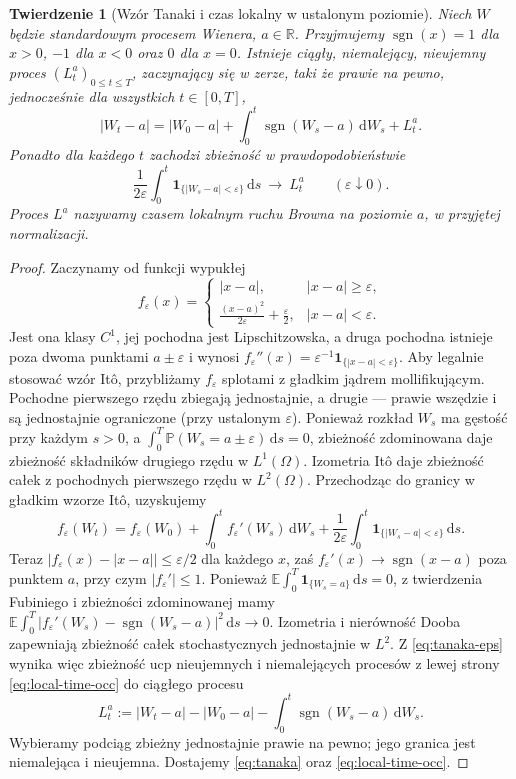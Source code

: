 \documentclass[11pt,a4paper,oneside]{report}
\numberwithin{equation}{chapter}
\theoremstyle{plain}
\newtheorem{twierdzenie}{Twierdzenie}[chapter]
\theoremstyle{definition}
\theoremstyle{remark}
\newcommand{\R}{\mathbb{R}}
\newcommand{\Prob}{\mathbb{P}}
\newcommand{\E}{\mathbb{E}}
\newcommand{\ind}[1]{\mathbf{1}_{#1}}
\newcommand{\dd}{\mathrm{d}}
\begin{document}
\begin{twierdzenie}[Wzór Tanaki i czas lokalny w ustalonym poziomie]\label{thm:volIII:03:05}
\label{th:tanaka}
Niech $W$ będzie standardowym procesem Wienera, $a\in\R$.
Przyjmujemy $\operatorname{sgn}(x)=1$ dla $x>0$,
$-1$ dla $x<0$ oraz $0$ dla $x=0$. Istnieje ciągły,
niemalejący, nieujemny proces $(L_t^a)_{0\le t\le T}$,
zaczynający się w zerze, taki że prawie na pewno,
jednocześnie dla wszystkich $t\in[0,T]$,
\[
|W_t-a|=|W_0-a|+\int_0^t\operatorname{sgn}(W_s-a)
\,\dd W_s+L_t^a.
\tag{3.7}\label{eq:tanaka}
\]
Ponadto dla każdego $t$ zachodzi zbieżność w
prawdopodobieństwie
\[
\frac1{2\varepsilon}\int_0^t
\ind{\{|W_s-a|<\varepsilon\}}\,\dd s
\ \longrightarrow\ L_t^a
\qquad(\varepsilon\downarrow0).
\tag{3.8}\label{eq:local-time-occ}
\]
Proces $L^a$ nazywamy \emph{czasem lokalnym} ruchu Browna
na poziomie $a$, w przyjętej normalizacji.
\end{twierdzenie}
\begin{proof}
Zaczynamy od funkcji wypukłej
\[
f_\varepsilon(x)=
\begin{cases}
|x-a|,&|x-a|\ge\varepsilon,\\
\displaystyle\frac{(x-a)^2}{2\varepsilon}+
\frac\varepsilon2,&|x-a|<\varepsilon.
\end{cases}
\]
Jest ona klasy $C^1$, jej pochodna jest Lipschitzowska,
a druga pochodna istnieje poza dwoma punktami
$a\pm\varepsilon$ i wynosi
$f_\varepsilon''(x)=\varepsilon^{-1}
\ind{\{|x-a|<\varepsilon\}}$.
Aby legalnie stosować wzór Itô, przybliżamy
$f_\varepsilon$ splotami z gładkim jądrem
mollifikującym. Pochodne pierwszego rzędu zbiegają
jednostajnie, a drugie — prawie wszędzie i są
jednostajnie ograniczone (przy ustalonym
$\varepsilon$). Ponieważ rozkład $W_s$ ma gęstość
przy każdym $s>0$, a $\int_0^T\Prob(W_s=a\pm\varepsilon)
\,\dd s=0$, zbieżność zdominowana daje
zbieżność składników drugiego rzędu w $L^1(\Omega)$.
Izometria Itô daje zbieżność całek z pochodnych
pierwszego rzędu w $L^2(\Omega)$.
Przechodząc do granicy w gładkim wzorze Itô, uzyskujemy
\[
f_\varepsilon(W_t)=f_\varepsilon(W_0)
+\int_0^t f_\varepsilon'(W_s)\,\dd W_s
+\frac1{2\varepsilon}\int_0^t
\ind{\{|W_s-a|<\varepsilon\}}\,\dd s.
\tag{3.9}\label{eq:tanaka-eps}
\]
Teraz $|f_\varepsilon(x)-|x-a||\le\varepsilon/2$ dla
każdego $x$, zaś $f_\varepsilon'(x)\to
\operatorname{sgn}(x-a)$ poza punktem $a$, przy czym
$|f_\varepsilon'|\le1$. Ponieważ
$\E\int_0^T\ind{\{W_s=a\}}\,\dd s=0$,
z twierdzenia Fubiniego i zbieżności zdominowanej
mamy
$\E\int_0^T|f_\varepsilon'(W_s)-
\operatorname{sgn}(W_s-a)|^2\,\dd s\to0$.
Izometria i nierówność Dooba zapewniają zbieżność
całek stochastycznych jednostajnie w $L^2$.
Z \eqref{eq:tanaka-eps} wynika więc zbieżność ucp
nieujemnych i niemalejących procesów z lewej strony
\eqref{eq:local-time-occ} do ciągłego procesu
\[
L_t^a:=|W_t-a|-|W_0-a|
-\int_0^t\operatorname{sgn}(W_s-a)\,\dd W_s.
\]
Wybieramy podciąg zbieżny jednostajnie prawie na pewno;
jego granica jest niemalejąca i nieujemna. Dostajemy
\eqref{eq:tanaka} oraz \eqref{eq:local-time-occ}.
\end{proof}
\end{document}
